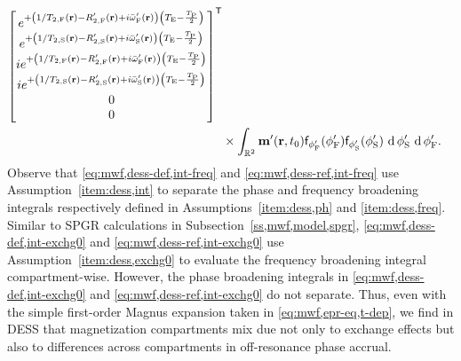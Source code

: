 \begin{align}
\begin{bmatrix}
				e^{+\paren{1/\tf{2}\pr-\Rtpf\pr+i\ompfmed\pr}\paren{\TE-\frac{\TP}{2}}} \\
				e^{+\paren{1/\ts{2}\pr-\Rtps\pr+i\ompsmed\pr}\paren{\TE-\frac{\TP}{2}}} \\
				ie^{+\paren{1/\tf{2}\pr-\Rtpf\pr+i\ompfmed\pr}\paren{\TE-\frac{\TP}{2}}} \\
				ie^{+\paren{1/\ts{2}\pr-\Rtps\pr+i\ompsmed\pr}\paren{\TE-\frac{\TP}{2}}} \\
				0 \\
				0
			\end{bmatrix}\tpose 
			\nonumber \\
		&\times \int_{\reals{2}} \bmmp\paren{\bmr,t_0}
			\dist{\phipf} \paren{\phipf} \dist{\phips} \paren{\phips} 
			\der{\phips} \der{\phipf}.
			\label{eq:mwf,dess-ref,int-exchg0}
\end{align}
Observe that
\eqref{eq:mwf,dess-def,int-freq} and \eqref{eq:mwf,dess-ref,int-freq}
use Assumption~\ref{item:dess,int}
to separate the phase and frequency broadening integrals
respectively defined 
in Assumptions~\ref{item:dess,ph} and \ref{item:dess,freq}.
Similar to SPGR calculations 
in Subsection~\ref{ss,mwf,model,spgr},
\eqref{eq:mwf,dess-def,int-exchg0} and \eqref{eq:mwf,dess-ref,int-exchg0}
use Assumption~\ref{item:dess,exchg0}
to evaluate the frequency broadening integral compartment-wise.
However,
the phase broadening integrals
in \eqref{eq:mwf,dess-def,int-exchg0} and \eqref{eq:mwf,dess-ref,int-exchg0}
do not separate.
Thus,
even with the simple first-order Magnus expansion
taken in \eqref{eq:mwf,epr-eq,t-dep},
we find in DESS 
that magnetization compartments mix 
due not only to exchange effects
but also to differences across compartments
in off-resonance phase accrual.

